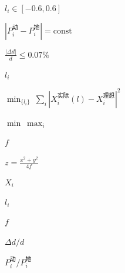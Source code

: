 
$l_i\in[-0.6,0.6]$

$|P_i^{动}-P_i^{地}|=\text{const}$

$\frac{|\Delta d|}{d}\le0.07\%$

$l_i$

$\min_{\{l_i\}}\ \sum_i|X_i^{实际}(l)-X_i^{理想}|^2$

$\min\ \max_i$

$f$

$z=\frac{x^2+y^2}{4f}$

$X_i$

$l_i$

$f$

$\Delta d/d$

$P_i^{动}/P_i^{地}$
